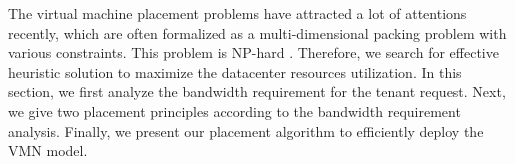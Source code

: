 \documentclass[review]{elsarticle}
\begin{document}
The virtual machine placement problems have attracted a lot of attentions recently, which are often formalized as a multi-dimensional packing problem with various constraints. This problem is NP-hard \cite{packing, fischer2013virtual}. %
Therefore, we search for effective heuristic solution to maximize the datacenter resources utilization. %
In this section, we first analyze the bandwidth requirement for the tenant request. Next, we give two placement principles according to the bandwidth requirement analysis. Finally, we present our placement algorithm to efficiently deploy the VMN model. 



\end{document}
